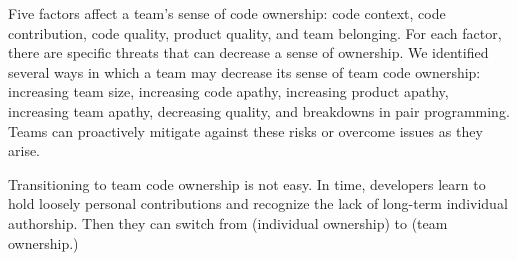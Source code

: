 Five factors affect a team’s sense of code ownership: code context, code contribution, code quality, product quality, and team belonging. For each factor, there are specific threats that can decrease a sense of ownership. We identified several ways in which a team may decrease its sense of team code ownership: increasing team size, increasing code apathy, increasing product apathy, increasing team apathy, decreasing quality, and breakdowns in pair programming. Teams can proactively mitigate against these risks or overcome issues as they arise. 

Transitioning to team code ownership is not easy. In time, developers learn to hold loosely personal contributions and recognize the lack of long-term individual authorship. Then they can switch from  (individual ownership) to  (team ownership.) 





